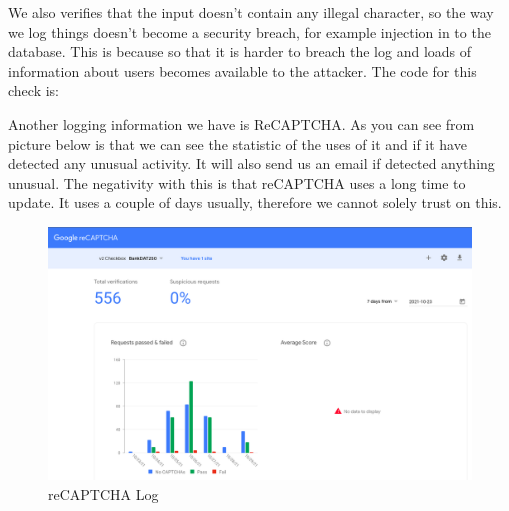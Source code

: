 We also verifies that the input doesn’t contain any illegal character, so the way we log things doesn’t become a security breach, for example injection in to the database. This is because so that it is harder to breach the log and loads of information about users becomes available to the attacker. The code for this check is: 


Another logging information we have is ReCAPTCHA. As you can see from picture below is that we can see the statistic of the uses of it and if it have detected any unusual activity. It will also send us an email if detected anything unusual. The negativity with this is that reCAPTCHA uses a long time to update. It uses a couple of days usually, therefore we cannot solely trust on this. 

\begin{figure}[H]
    \centering
    \includegraphics[width=\textwidth]{pics/recaptchaLog.png}
    \caption{reCAPTCHA Log}
    \label{fig:cha3fig1recaptchalog}
\end{figure}
